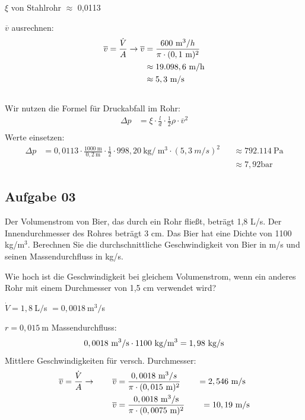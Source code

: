 \documentclass[a4paper,11pt]{article}
\begin{document}
$\xi$ von Stahlrohr $\approx$ 0,0113 \par 
$\overline{v}$ ausrechnen:
\begin{align*}
\overline{v} = \frac{\dot{V}}{A} \rightarrow \overline{v} &= \frac{600~ \text{m}^3/h}{\pi \cdot (0,1~\text{m})^2} \\
 &\approx 19.098,6~\text{m/h} \\
 &\approx 5,3~\text{m/s}  \\ \\
\end{align*}
Wir nutzen die Formel für Druckabfall im Rohr:
\begin{align*}
\Delta p &= \xi \cdot \frac{l}{d} \cdot \frac{1}{2} \rho \cdot \overline{v}^2\\
\end{align*}
Werte einsetzen:
\begin{align*}
\Delta p &= 0,0113 \cdot \frac{1000~\text{m}}{0,2~\text{m}} \cdot \frac{1}{2} \cdot 998,20 ~\text{kg}/~\text{m}^3 \cdot (5,3~m/s)^2 &&\approx 792.114~\text{Pa}\\
& &&\approx 7,92 \text{bar}
\end{align*}


\pagebreak

\subsection*{Aufgabe 03}
Der Volumenstrom von Bier, das durch ein Rohr fließt, beträgt 1,8 L/s. Der
Innendurchmesser des Rohres beträgt 3 cm. Das Bier hat eine Dichte von 1100 kg/m$^3$.
Berechnen Sie die durchschnittliche Geschwindigkeit von Bier in m/s und seinen Massendurchfluss in kg/s. \par Wie hoch ist die Geschwindigkeit bei gleichem Volumenstrom, wenn ein anderes Rohr mit einem Durchmesser von 1,5 cm verwendet wird?

$\dot{V} = 1,8 ~$L$/$s $ = 0,0018~$m$^3/$s \par 
$r=0,015~$m \pp
Massendurchfluss:
\begin{align*}
0,0018~\text{m}^3/\text{s} \cdot 1100~\text{kg}/\text{m}^3 = 1,98~\text{kg}/\text{s}
\end{align*}
Mittlere Geschwindigkeiten für versch. Durchmesser:
\begin{align*}
\overline{v} = \frac{\dot{V}}{A} \rightarrow \qquad \overline{v} &= \frac{0,0018~\text{m}^3/s}{\pi \cdot (0,015~\text{m})^2} \qquad = 2,546~\text{m}/\text{s} \\
\overline{v} &= \frac{0,0018~\text{m}^3/\text{s}}{\pi \cdot (0,0075~\text{m})^2} \qquad = 10,19~\text{m}/\text{s} \\
\end{align*}
\end{document}
